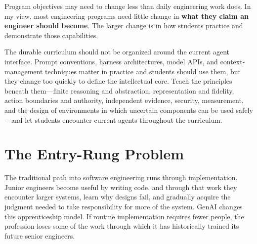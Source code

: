 
Program objectives may need to change less than daily engineering work does. In my view, most engineering programs need little change in \textbf{what they claim an engineer should become}. The larger change is in how students practice and demonstrate those capabilities.


The durable curriculum should not be organized around the current agent interface. Prompt conventions, harness architectures, model APIs, and context-management techniques matter in practice and students should use them, but they change too quickly to define the intellectual core. Teach the principles beneath them---finite reasoning and abstraction, representation and fidelity, action boundaries and authority, independent evidence, security, measurement, and the design of environments in which uncertain components can be used safely---and let students encounter current agents throughout the curriculum.

\section{The Entry-Rung Problem}\label{heading:the-entry-rung-problem}


The traditional path into software engineering runs through implementation. Junior engineers become useful by writing code, and through that work they encounter larger systems, learn why designs fail, and gradually acquire the judgment needed to take responsibility for more of the system. GenAI changes this apprenticeship model. If routine implementation requires fewer people, the profession loses some of the work through which it has historically trained its future senior engineers.


